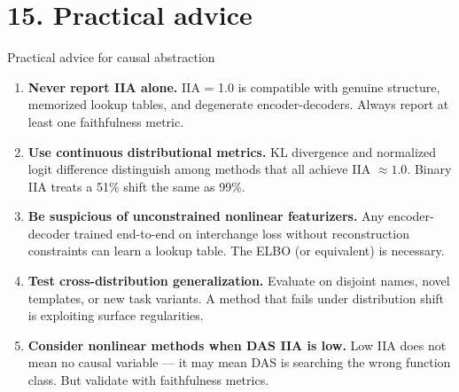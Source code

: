 \documentclass[aspectratio=169,11pt]{beamer}
\begin{document}
\hypertarget{sec15}{}
\section{15. Practical advice}

\begin{frame}{Practical advice for causal abstraction}

\begin{enumerate}
  \item {\small \textbf{Never report IIA alone.} IIA = 1.0 is compatible with genuine structure, memorized lookup tables, and degenerate encoder-decoders. Always report at least one faithfulness metric.}

  \vspace{0.3em}
  \item {\small \textbf{Use continuous distributional metrics.} KL divergence and normalized logit difference distinguish among methods that all achieve IIA $\approx 1.0$. Binary IIA treats a 51\% shift the same as 99\%.}

  \vspace{0.3em}
  \item {\small \textbf{Be suspicious of unconstrained nonlinear featurizers.} Any encoder-decoder trained end-to-end on interchange loss without reconstruction constraints can learn a lookup table. The ELBO (or equivalent) is necessary.}

  \vspace{0.3em}
  \item {\small \textbf{Test cross-distribution generalization.} Evaluate on disjoint names, novel templates, or new task variants. A method that fails under distribution shift is exploiting surface regularities.}

  \vspace{0.3em}
  \item {\small \textbf{Consider nonlinear methods when DAS IIA is low.} Low IIA does not mean no causal variable --- it may mean DAS is searching the wrong function class. But validate with faithfulness metrics.}
\end{enumerate}
\end{frame}
\end{document}
